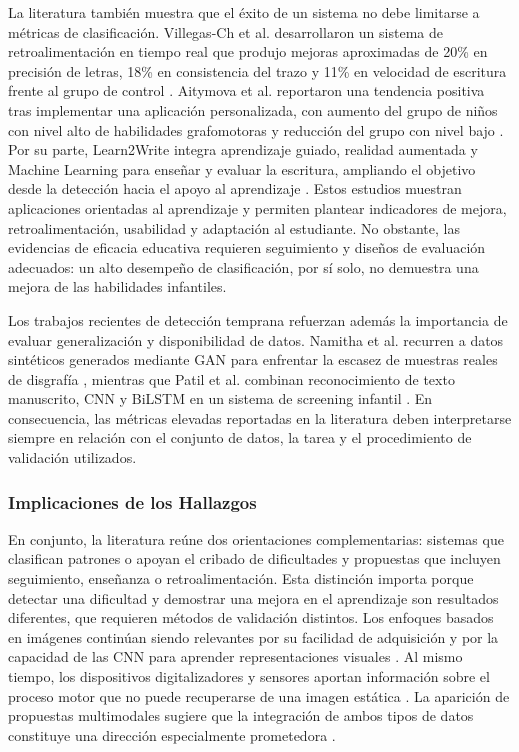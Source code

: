 \documentclass{iaesarticle}
\begin{document}
La literatura también muestra que el éxito de un sistema no debe limitarse a
métricas de clasificación. Villegas-Ch et al. desarrollaron un sistema de
retroalimentación en tiempo real que produjo mejoras aproximadas de 20\% en
precisión de letras, 18\% en consistencia del trazo y 11\% en velocidad de
escritura frente al grupo de control \cite{Villegas-Ch2024}. Aitymova et al.
reportaron una tendencia positiva tras implementar una aplicación
personalizada, con aumento del grupo de niños con nivel alto de habilidades
grafomotoras y reducción del grupo con nivel bajo \cite{Aitymova2025}. Por su
parte, Learn2Write integra aprendizaje guiado, realidad aumentada y Machine
Learning para enseñar y evaluar la escritura, ampliando el objetivo desde la
detección hacia el apoyo al aprendizaje \cite{Opu2022}. Estos estudios muestran aplicaciones orientadas al aprendizaje y permiten
plantear indicadores de mejora, retroalimentación, usabilidad y adaptación al
estudiante. No obstante, las evidencias de eficacia educativa requieren
seguimiento y diseños de evaluación adecuados: un alto desempeño de
clasificación, por sí solo, no demuestra una mejora de las habilidades
infantiles.

Los trabajos recientes de detección temprana refuerzan además la importancia de
evaluar generalización y disponibilidad de datos. Namitha et al. recurren a
datos sintéticos generados mediante GAN para enfrentar la escasez de muestras
reales de disgrafía \cite{Namitha2026}, mientras que Patil et al. combinan
reconocimiento de texto manuscrito, CNN y BiLSTM en un sistema de screening
infantil \cite{Patil2024}. En consecuencia, las métricas elevadas reportadas en
la literatura deben interpretarse siempre en relación con el conjunto de datos,
la tarea y el procedimiento de validación utilizados.

\subsubsection{Implicaciones de los Hallazgos}

En conjunto, la literatura reúne dos orientaciones complementarias: sistemas
que clasifican patrones o apoyan el cribado de dificultades y propuestas que
incluyen seguimiento, enseñanza o retroalimentación. Esta distinción importa
porque detectar una dificultad y demostrar una mejora en el aprendizaje son
resultados diferentes, que requieren métodos de validación distintos. Los enfoques basados en
imágenes continúan siendo relevantes por su facilidad de adquisición y por la
capacidad de las CNN para aprender representaciones visuales
\cite{Kunhoth2023a,Alheraki2023}. Al mismo tiempo, los dispositivos
digitalizadores y sensores aportan información sobre el proceso motor que no
puede recuperarse de una imagen estática
\cite{Kunhoth2023b,Bublin2023,Gavenciak2025}. La aparición de propuestas
multimodales sugiere que la integración de ambos tipos de datos constituye una
dirección especialmente prometedora \cite{Kunhoth2026}.
\end{document}

